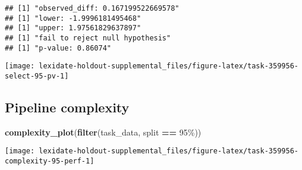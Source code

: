 \documentclass[
]{book}
\newenvironment{Shaded}{\begin{snugshade}}{\end{snugshade}}
\newcommand{\AttributeTok}[1]{\textcolor[rgb]{0.13,0.29,0.53}{#1}}
\newcommand{\DecValTok}[1]{\textcolor[rgb]{0.00,0.00,0.81}{#1}}
\newcommand{\FunctionTok}[1]{\textcolor[rgb]{0.13,0.29,0.53}{\textbf{#1}}}
\newcommand{\NormalTok}[1]{#1}
\newcommand{\OtherTok}[1]{\textcolor[rgb]{0.56,0.35,0.01}{#1}}
\newcommand{\SpecialCharTok}[1]{\textcolor[rgb]{0.81,0.36,0.00}{\textbf{#1}}}
\newcommand{\StringTok}[1]{\textcolor[rgb]{0.31,0.60,0.02}{#1}}
\begin{document}
\begin{Shaded}
\end{Shaded}

\begin{verbatim}
## [1] "observed_diff: 0.167199522669578"
## [1] "lower: -1.9996181495468"
## [1] "upper: 1.97561829637897"
## [1] "fail to reject null hypothesis"
## [1] "p-value: 0.86074"
\end{verbatim}

\texttt{[image: lexidate-holdout-supplemental\_files/figure-latex/task-359956-select-95-pv-1]}

\hypertarget{pipeline-complexity-28}{%
\subsection{Pipeline complexity}\label{pipeline-complexity-28}}

\begin{Shaded}
\begin{Highlighting}[]
\FunctionTok{complexity\_plot}\NormalTok{(}\FunctionTok{filter}\NormalTok{(task\_data, split }\SpecialCharTok{==} \StringTok{\textquotesingle{}95\%\textquotesingle{}}\NormalTok{))}
\end{Highlighting}
\end{Shaded}

\texttt{[image: lexidate-holdout-supplemental\_files/figure-latex/task-359956-complexity-95-perf-1]}
\end{document}
